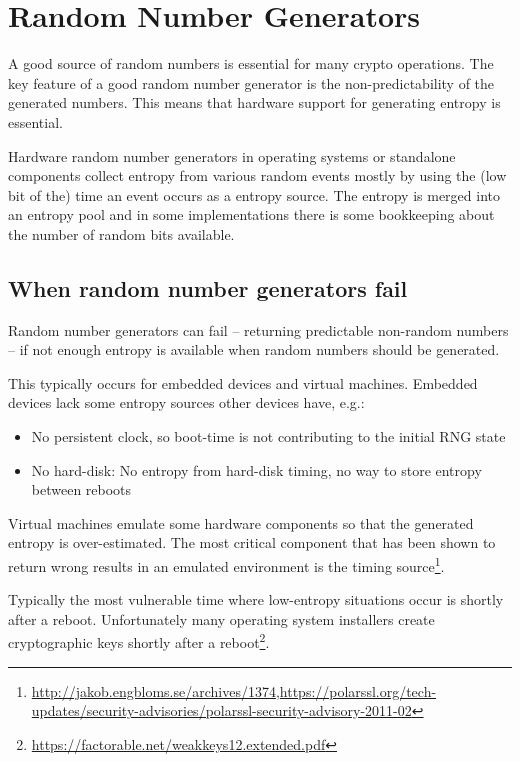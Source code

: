 \section{Random Number Generators}
\label{section:RNGs}


A good source of random numbers is essential for many crypto
operations. The key feature of a good random number generator is the
non-predictability of the generated numbers. This means that hardware
support for generating entropy is essential.


Hardware random number generators in operating systems or standalone
components collect entropy from various random events mostly by using
the (low bit of the) time an event occurs as a entropy source. The
entropy is merged into an entropy pool and in some implementations there
is some bookkeeping about the number of random bits available.

\subsection{When random number generators fail}

Random number generators can fail -- returning predictable non-random
numbers -- if not enough entropy is available when random numbers should
be generated.

This typically occurs for embedded devices and virtual machines.
Embedded devices lack some entropy sources other devices have, e.g.:

\begin{itemize}
\item No persistent clock, so boot-time is not contributing to the
    initial RNG state
\item No hard-disk: No entropy from hard-disk timing, no way to store
    entropy between reboots
\end{itemize}

Virtual machines emulate some hardware components so that the
generated entropy is over-estimated. The most critical component that
has been shown to return wrong results in an emulated environment is the
timing
source\footnote{\url{http://jakob.engbloms.se/archives/1374},\url{https://polarssl.org/tech-updates/security-advisories/polarssl-security-advisory-2011-02}}.

Typically the most vulnerable time where low-entropy situations occur is
shortly after a reboot. Unfortunately many operating system installers
create cryptographic keys shortly after a
reboot\footnote{\url{https://factorable.net/weakkeys12.extended.pdf}}.

